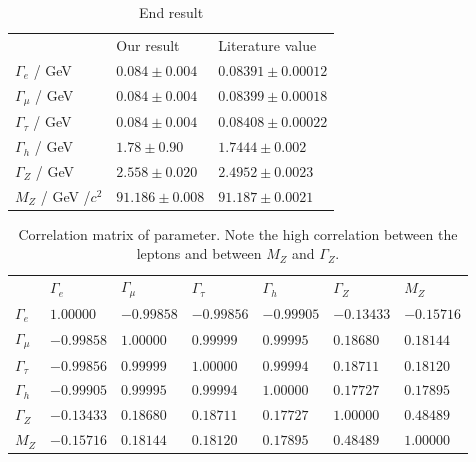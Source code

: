 \begin{table}[htpb]
    \centering
    \caption{End result}
    \label{tab:results}
    \begin{tabular}{l l l}
 \rowcolor{LightCyan} & Our result & Literature value \\
 \cellcolor{LightCyan}$\Gamma_e$ / GeV &   $ 0.084\pm0.004   $ & $0.08391 \pm 0.00012 $\\
 \cellcolor{LightCyan}$\Gamma_\mu$ / GeV&   $ 0.084\pm0.004 $ & $0.08399 \pm 0.00018 $\\
 \cellcolor{LightCyan}$\Gamma_\tau$ / GeV&   $ 0.084\pm0.004   $ & $0.08408 \pm 0.00022 $\\
 \cellcolor{LightCyan}$\Gamma_h$ / GeV&   $ 1.78\pm0.90     $ & $1.7444\pm0.002      $\\
 \cellcolor{LightCyan}$\Gamma_Z$ / GeV&   $ 2.558\pm0.020   $ & $2.4952\pm0.0023     $\\
 \cellcolor{LightCyan}$M_Z    $ / GeV /$c^2$&   $ 91.186\pm0.008  $ & $91.187\pm0.0021     $\\
    \end{tabular}
\end{table}

\begin{table}[htpb]
    \centering
    \caption{Correlation matrix of parameter. Note the high correlation between the leptons and between $M_Z$ and $\Gamma_Z$.}
    \label{tab:covmat}

\begin{tabular}{l| l| l| l |l | l|l}
\rowcolor{LightCyan} & $\Gamma_e$ & $\Gamma_\mu$ & $\Gamma_\tau$ & $\Gamma_h$ &$\Gamma_Z$ & $M_Z$ \\ 
\cellcolor{LightCyan} $\Gamma_e$ & $1.00000$ & $-0.99858$ & $-0.99856$ & $-0.99905$ & $-0.13433$ & $-0.15716$ \\ 
\cellcolor{LightCyan} $\Gamma_\mu$ & $-0.99858$ & $1.00000$ & $0.99999$ & $0.99995$ & $0.18680$ & $0.18144$ \\ 
\cellcolor{LightCyan} $\Gamma_\tau$ & $-0.99856$ & $0.99999$ & $1.00000$ & $0.99994$ & $0.18711$ & $0.18120$ \\ 
\cellcolor{LightCyan} $\Gamma_h$ & $-0.99905$ & $0.99995$ & $0.99994$ & $1.00000$ & $0.17727$ & $0.17895$ \\ 
\cellcolor{LightCyan} $\Gamma_Z$ & $-0.13433$ & $0.18680$ & $0.18711$ & $0.17727$ & $1.00000$ & $0.48489$ \\ 
\cellcolor{LightCyan} $M_Z$ & $-0.15716$ & $0.18144$ & $0.18120$ & $0.17895$ & $0.48489$ & $1.00000$ \\ 
\end{tabular}



\end{table}

